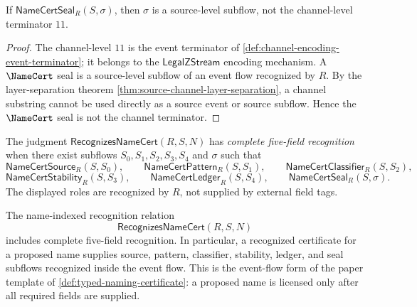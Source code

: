 \begin{proposition}
\label{prop:namecert-generated-seal-not-channel-terminator}
If $\mathsf{NameCertSeal}_{R}(S,\sigma)$, then $\sigma$ is a source-level subflow, not the channel-level terminator $11$.
\end{proposition}

\begin{proof}
The channel-level $11$ is the event terminator of \autoref{def:channel-encoding-event-terminator}; it belongs to the $\mathsf{LegalZStream}$ encoding mechanism. A $\NameCert$ seal is a source-level subflow of an event flow recognized by $R$. By the layer-separation theorem \autoref{thm:source-channel-layer-separation}, a channel substring cannot be used directly as a source event or source subflow. Hence the $\NameCert$ seal is not the channel terminator.
\end{proof}

\begin{definition}
\label{def:namecert-generated-complete-five-field-recognition}
The judgment $\mathsf{RecognizesNameCert}(R,S,N)$ has \emph{complete five-field recognition} when there exist subflows $S_{0},S_{1},S_{2},S_{3},S_{4}$ and $\sigma$ such that
$$
  \mathsf{NameCertSource}_{R}(S,S_{0}),\qquad
  \mathsf{NameCertPattern}_{R}(S,S_{1}),\qquad
  \mathsf{NameCertClassifier}_{R}(S,S_{2}),
$$
$$
  \mathsf{NameCertStability}_{R}(S,S_{3}),\qquad
  \mathsf{NameCertLedger}_{R}(S,S_{4}),\qquad
  \mathsf{NameCertSeal}_{R}(S,\sigma).
$$
The displayed roles are recognized by $R$, not supplied by external field tags.
\end{definition}

\begin{principle}
\label{prin:namecert-generated-no-namecert-without-five-fields}
The name-indexed recognition relation
$$
  \mathsf{RecognizesNameCert}(R,S,N)
$$
includes complete five-field recognition. In particular, a recognized certificate for a proposed name supplies source, pattern, classifier, stability, ledger, and seal subflows recognized inside the event flow. This is the event-flow form of the paper template of \autoref{def:typed-naming-certificate}: a proposed name is licensed only after all required fields are supplied.
\end{principle}

